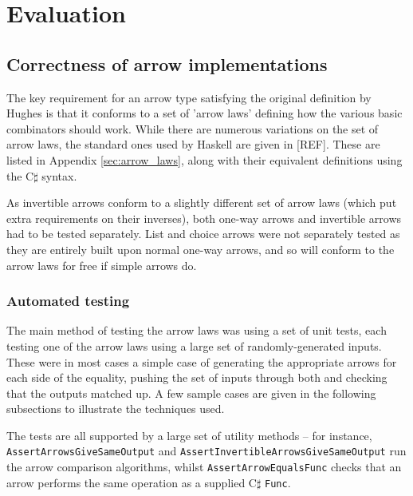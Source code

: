 \documentclass[12pt,twoside,notitlepage]{report}
\begin{document}
\cleardoublepage



\chapter{Evaluation}

\section{Correctness of arrow implementations}

The key requirement for an arrow type satisfying the original definition by Hughes is that it conforms to a set of 'arrow laws' defining how the various basic combinators should work. While there are numerous variations on the set of arrow laws, the standard ones used by Haskell are given in [REF]. These are listed in Appendix \ref{sec:arrow_laws}, along with their equivalent definitions using the C$\sharp$ syntax.

As invertible arrows conform to a slightly different set of arrow laws (which put extra requirements on their inverses), both one-way arrows and invertible arrows had to be tested separately. List and choice arrows were not separately tested as they are entirely built upon normal one-way arrows, and so will conform to the arrow laws for free if simple arrows do.


\subsection{Automated testing}

The main method of testing the arrow laws was using a set of unit tests, each testing one of the arrow laws using a large set of randomly-generated inputs. These were in most cases a simple case of generating the appropriate arrows for each side of the equality, pushing the set of inputs through both and checking that the outputs matched up. A few sample cases are given in the following subsections to illustrate the techniques used.

The tests are all supported by a large set of utility methods -- for instance, \texttt{AssertArrowsGiveSameOutput} and \texttt{AssertInvertibleArrowsGiveSameOutput} run the arrow comparison algorithms, whilst \texttt{AssertArrowEqualsFunc} checks that an arrow performs the same operation as a supplied C$\sharp$ \texttt{Func}.
\end{document}
